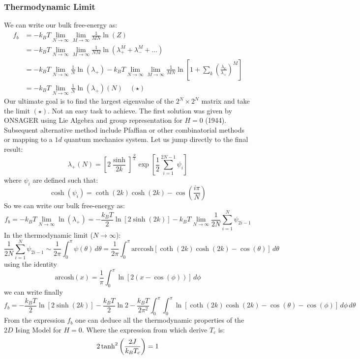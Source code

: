 \documentclass[../../Main/Main.tex]{subfiles}
\begin{document}
\subsubsection*{Thermodynamic Limit}
We can write our bulk free-energy as:
\begin{align}
f_{b} &= -k_{B}T \lim_{ N \to \infty } \lim_{ M \to \infty } \frac{1}{MN} \ln(Z) \\
&= -k_{B}T \lim_{ N \to \infty } \lim_{ M \to \infty } \frac{1}{NM} \ln(\lambda_{+}^{M} + \lambda_{-}^{M} + \dots) \\
&= -k_{B}T \lim_{ N \to \infty } \frac{1}{N}\ln(\lambda_{+}) - k_{B}T \lim_{ N \to \infty } \lim_{ M \to \infty } \frac{1}{MN} \ln\left[ 1 + \sum_{k} \left( \frac{\lambda_{k}}{\lambda_{+}} \right)^{M} \right]  \\
&= -k_{B}T \lim_{ N \to \infty } \frac{1}{N}\ln(\lambda_{+})(N) \quad (\star)
\end{align}
Our ultimate goal is to find the largest eigenvalue of the $2^{N}\times 2^{N}$ matrix and take the limit $(\star)$.
Not an easy task to achieve.
The first solution was given by ONSAGER using Lie Algebra and group representation for $H = 0$ (1944).
Subsequent alternative method include Pfaffian or other combinatorial methods or mapping to a $1d$ quantum mechanics system.
Let us jump directly to the final result:
$$\lambda_{+}(N) = \left[ 2 \frac{\sinh}{2k} \right]^{\frac{N}{2}} \exp\left[ \frac{1}{2}\sum_{i=1}^{2N -1}\psi_{i} \right]$$
where $\psi_{i}$ are defined such that:
$$\cosh(\psi_{i}) = \coth(2k)\cosh(2k)-\cos\left( \frac{i\pi}{N} \right)$$
So we can write our bulk free-energy as:
$$f_{b} = -k_{B}T\lim_{ N \to \infty } \ln(\lambda_{+}) = -\frac{k_{B}T}{2}\ln[2\sinh(2k)] - k_{B}T \lim_{ N \to \infty } \frac{1}{2N}\sum_{i=1}^{N}\psi_{2i - 1}$$
In the thermodynamic limit ($N\to \infty$):
$$\frac{1}{2N} \sum_{i=1}^{N} \psi_{2i-1} \sim \frac{1}{2\pi} \int _{0}^{\pi} \psi(\theta) \, d\theta = \frac{1}{2\pi} \int _{0}^{\pi}\text{arccosh}[\coth(2k)\cosh(2k) - \cos(\theta)] \, d\theta $$
using the identity
$$\text{arcosh}(x) = \frac{1}{\pi} \int _{0}^{\pi}\ln[2(x-\cos(\phi))] \, d\phi $$
we can write finally
$$f_{b} = -\frac{k_{B}T}{2} \ln[2\sinh(2k)] - \frac{k_{B}T}{2}\ln 2 - \frac{k_{B}T}{2\pi^{2}} \int _{0}^{\pi}\int _{0}^{\pi} \ln[\coth(2k)\cosh(2k) - \cos(\theta) - \cos(\phi)] \, d\phi  \, d\theta $$
From the expression $f_{b}$ one can deduce all the thermodynamic properties of the $2D$ Ising Model for $H = 0$.
Where the expression from which derive  \(T_c\) is:
\begin{equation*}
  2 \tanh^2 \qty(\frac{2J}{k_B T_c}) = 1 
\end{equation*}
\end{document}

